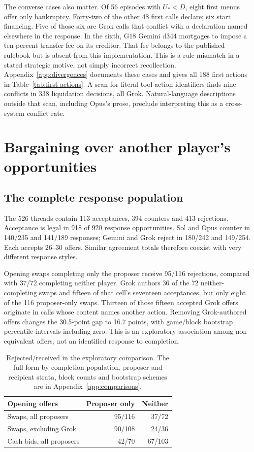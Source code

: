 The converse cases also matter. Of 56 episodes with $U_*<D$, eight first menus offer only bankruptcy. Forty-two of the other 48 first calls declare; six start financing. Five of those six are Grok calls that conflict with a declaration named elsewhere in the response. In the sixth, G18 Gemini d344 mortgages to impose a ten-percent transfer fee on its creditor. That fee belongs to the published rulebook but is absent from this implementation. This is a rule mismatch in a stated strategic motive, not simply incorrect recollection. Appendix~\ref{app:divergences} documents these cases and gives all 188 first actions in Table~\ref{tab:first-actions}. A scan for literal tool-action identifiers finds nine conflicts in 338 liquidation decisions, all Grok. Natural-language descriptions outside that scan, including Opus's prose, preclude interpreting this as a cross-system conflict rate.

\section{Bargaining over another player's opportunities}
\label{sec:bargaining}
\subsection{The complete response population}
The 526 threads contain 113 acceptances, 394 counters and 413 rejections. Acceptance is legal in 918 of 920 response opportunities. Sol and Opus counter in 140/235 and 141/189 responses; Gemini and Grok reject in 180/242 and 149/254. Each accepts 26--30 offers. Similar agreement totals therefore coexist with very different response styles.

Opening swaps completing only the proposer receive 95/116 rejections, compared with 37/72 completing neither player. Grok authors 36 of the 72 neither-completing swaps and fifteen of that cell's seventeen acceptances, but only eight of the 116 proposer-only swaps. Thirteen of those fifteen accepted Grok offers originate in calls whose content names another action. Removing Grok-authored offers changes the 30.5-point gap to 16.7 points, with game/block bootstrap percentile intervals including zero. This is an exploratory association among non-equivalent offers, not an identified response to completion.

\begin{table}[t]\centering\small
\begin{tabular}{@{}lrr@{}}\toprule
Opening offers & Proposer only & Neither\\\midrule
Swaps, all proposers &95/116&37/72\\
Swaps, excluding Grok &90/108&24/36\\
Cash bids, all proposers &42/70&67/103\\\bottomrule
\end{tabular}
\caption{Rejected/received in the exploratory comparison. The full form-by-completion population, proposer and recipient strata, block counts and bootstrap schemes are in Appendix~\ref{app:comparisons}.}
\end{table}

